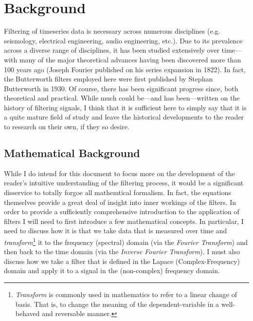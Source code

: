 \documentclass[american, twoside]{article}
\begin{document}
\section{Background} \label{Background}
Filtering of timeseries data is necessary across numerous disciplines (e.g. seismology, electrical engineering, audio engineering, etc.). Due to its prevalence
across a diverse range of disciplines, it has been studied extensively over time---with many of the major theoretical advances having been discovered
more than 100 years ago (Joseph Fourier published on his series expansion in 1822\autocite{fourier1822theorie}). In fact, the Butterworth filters employed here were first published
by Stephan Butterworth in 1930\autocite{butterworth1930theory}. Of course, there has been significant progress since, both theoretical and practical. While much could be---and has been---written
on the history of filtering signals, I think that it is sufficient here to simply say that it is a quite mature field of study and leave the historical developments
to the reader to research on their own, if they so desire.

\subsection{Mathematical Background} \label{Background:Math}
While I do intend for this document to focus more on the development of the reader's intuitive understanding of the filtering process, it would be a significant
disservice to totally forgoe all mathemtical formalism. In fact, the equations themselves provide a great deal of insight into inner workings of the filters.
In order to provide a sufficiently comprehensive introduction to the application of filters I will need to first introduce a few mathematical concepts. In particular,
I need to discuss how it is that we take data that is measured over time and \textit{transform}\footnote{\textit{Transform} is commonly used in mathematics to refer to
a linear change of basis. That is, to change the meaning of the dependent-variable in a well-behaved and reversable manner.} it to the frequency (spectral) domain (via the \textit{Fourier Transform})
and then back to the time domain (via the \textit{Inverse Fourier Transform}). I must also discuss how we take a filter that is defined in the Lapace (Complex-Frequency)
domain and apply it to a signal in the (non-complex) frequency domain.
\end{document}

